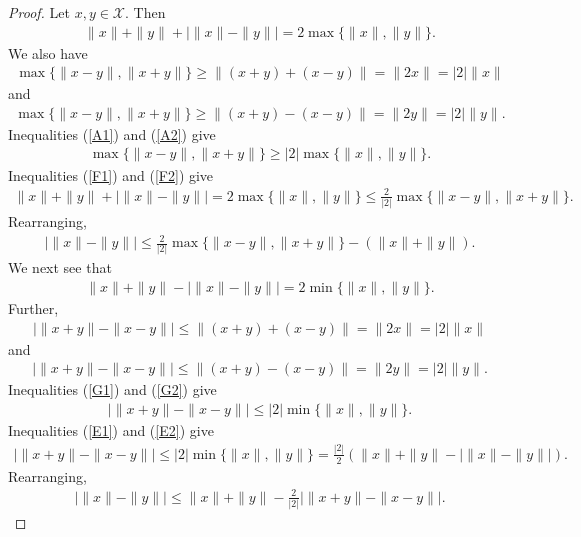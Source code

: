 \documentclass{amsart}
\begin{document}
\begin{proof}
	Let $x, y \in \mathcal{X}$. Then 
	\begin{align}\label{F1}
		\|x\|+\|y\|+\bigg|\|x\|-\|y\|\bigg|=2\max\{\|x\|, \|y\|\}.
	\end{align}	
We also have 
\begin{align}\label{A1}
	\max\{\|x-y\|, \|x+y\|\}\geq \|(x+y)+(x-y)\|=\|2x\|=|2|\|x\|
\end{align}
and 
\begin{align}\label{A2}
	\max\{\|x-y\|, \|x+y\|\}\geq \|(x+y)-(x-y)\|=\|2y\|=|2|\|y\|.
\end{align}
Inequalities (\ref{A1}) and (\ref{A2}) give 
\begin{align}\label{F2}
		\max\{\|x-y\|, \|x+y\|\}\geq |2|\max\{\|x\|, \|y\|\}.
\end{align}
Inequalities (\ref{F1}) and (\ref{F2}) give 
\begin{align*}
	\|x\|+\|y\|+\bigg|\|x\|-\|y\|\bigg|=2\max\{\|x\|, \|y\|\}\leq \frac{2}{|2|}\max\{\|x-y\|, \|x+y\|\}.
\end{align*}
Rearranging, 
\begin{align*}
\bigg|\|x\|-\|y\|\bigg|\leq \frac{2}{|2|}\max\{\|x-y\|, \|x+y\|\}-(\|x\|+\|y\|).
\end{align*}
We next see that 
	\begin{align}\label{E1}
	\|x\|+\|y\|-\bigg|\|x\|-\|y\|\bigg|=2\min\{\|x\|, \|y\|\}.
\end{align}	
Further, 
\begin{align}\label{G1}
	\bigg|\|x+y\|-\|x-y\|\bigg|\leq	\|(x+y)+(x-y)\|=\|2x\|=|2|\|x\|
\end{align}
and 
\begin{align}\label{G2}
	\bigg|\|x+y\|-\|x-y\|\bigg|\leq	\|(x+y)-(x-y)\|=\|2y\|=|2|\|y\|.
\end{align}
Inequalities (\ref{G1}) and (\ref{G2}) give 
\begin{align}\label{E2}
	\bigg|\|x+y\|-\|x-y\|\bigg|\leq	|2|\min\{\|x\|, \|y\|\}.
\end{align}
Inequalities (\ref{E1}) and (\ref{E2}) give 
\begin{align*}
		\bigg|\|x+y\|-\|x-y\|\bigg|\leq	|2|\min\{\|x\|, \|y\|\}= \frac{|2|}{2}\left(\|x\|+\|y\|-\bigg|\|x\|-\|y\|\bigg|\right).
\end{align*}
Rearranging, 
\begin{align*}
\bigg|\|x\|-\|y\|\bigg|\leq \|x\|+\|y\|-\frac{2}{|2|}\bigg|\|x+y\|-\|x-y\|\bigg|.
\end{align*}
\end{proof}
\end{document}
